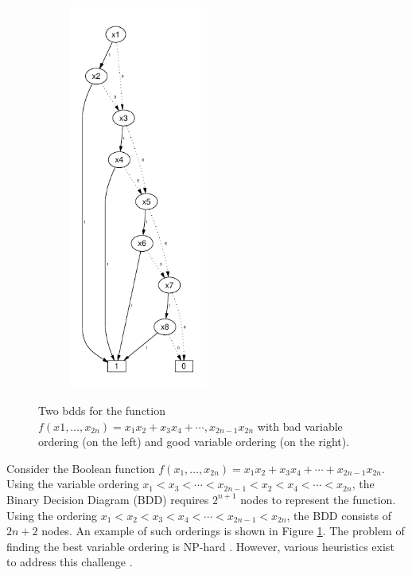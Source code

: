 \documentclass[pdflatex,sn-mathphys-num]{sn-jnl}%
\theoremstyle{thmstyleone}%
\theoremstyle{thmstyletwo}%
\theoremstyle{thmstylethree}%
\begin{document}
\begin{figure}[h]
\begin{subfigure}{0.3\textwidth}
                \includegraphics[width=0.5\textwidth]{Figures/BDD_Variable_Ordering_Good.pdf}
            \end{subfigure}
            \caption{Two bdds for the function $f(x1,\dots, x_{2n}) = x_1x_2 + x_3x_4 + \cdots, x_{2n-1}x_{2n}$ with bad variable ordering (on the left) and good variable ordering (on the right).}
            \label{figure::ordering}
        \end{figure}

        Consider the Boolean function $f(x_1, \dots, x_{2n}) = x_1x_2 + x_3x_4 + \cdots + x_{2n-1}x_{2n}$. Using the variable ordering $x_1 < x_3 < \cdots < x_{2n-1} < x_2 < x_4 < \cdots < x_{2n}$, the Binary Decision Diagram (BDD) requires $2^{n+1}$ nodes to represent the function. Using the ordering $x_1 < x_2 < x_3 < x_4 < \cdots < x_{2n-1} < x_{2n}$, the BDD consists of $2n + 2$ nodes. An example of such orderings is shown in Figure \ref{figure::ordering}. The problem of finding the best variable ordering is NP-hard \cite{BDD_np-hard}. However, various heuristics exist to address this challenge \cite{BDD_heuristics}.
\end{document}
